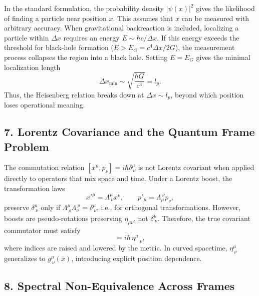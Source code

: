 \documentclass[11pt,oneside]{book}
\numberwithin{equation}{chapter}
\begin{document}
In the standard formulation, the probability density $|\psi(x)|^2$ gives the likelihood of finding a particle near position $x$.  
This assumes that $x$ can be measured with arbitrary accuracy.  
When gravitational backreaction is included, localizing a particle within $\Delta x$ requires an energy $E\sim\hbar c/\Delta x$.  
If this energy exceeds the threshold for black-hole formation ($E > E_G = c^4\Delta x/2G$), the measurement process collapses the region into a black hole.  
Setting $E=E_G$ gives the minimal localization length
\begin{equation}
\Delta x_{\min} \sim \sqrt{\frac{\hbar G}{c^3}} = l_p.
\end{equation}
Thus, the Heisenberg relation breaks down at $\Delta x \sim l_p$, beyond which position loses operational meaning.

\subsection*{7. Lorentz Covariance and the Quantum Frame Problem}

The commutation relation $[x^\mu,p_\nu]=i\hbar\delta^\mu_{\ \nu}$ is not Lorentz covariant when applied directly to operators that mix space and time.  
Under a Lorentz boost, the transformation laws
\begin{equation}
x'^\mu = \Lambda^\mu_{\ \nu}x^\nu, \qquad
p'_\mu = \Lambda_\mu^{\ \nu}p_\nu,
\end{equation}
preserve $\delta^\mu_{\ \nu}$ only if $\Lambda^\mu_{\ \rho}\Lambda_\nu^{\ \rho}=\delta^\mu_{\ \nu}$, i.e., for orthogonal transformations.  
However, boosts are pseudo-rotations preserving $\eta_{\mu\nu}$, not $\delta^\mu_{\ \nu}$.  
Therefore, the true covariant commutator must satisfy
\begin{equation}
[x^\mu,p_\nu] = i\hbar\,{\eta^\mu}_{\ \nu},
\end{equation}
where indices are raised and lowered by the metric.  
In curved spacetime, $\eta^\mu_{\ \nu}$ generalizes to $g^\mu_{\ \nu}(x)$, introducing explicit position dependence.

\subsection*{8. Spectral Non-Equivalence Across Frames}
\end{document}

